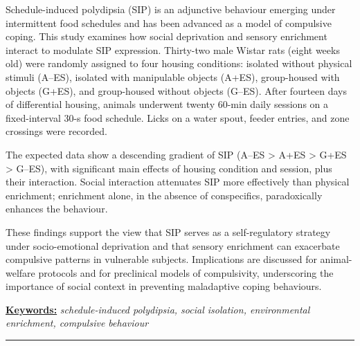 \documentclass[12pt,a4paper]{article}
\begin{document}
    \begin{center}
    \begin{minipage}{0.9\textwidth}
    \noindent
    Schedule-induced polydipsia (SIP) is an adjunctive behaviour emerging under intermittent food schedules and has been advanced as a model of compulsive coping. This study examines how social deprivation and sensory enrichment interact to modulate SIP expression. Thirty-two male Wistar rats (eight weeks old) were randomly assigned to four housing conditions: isolated without physical stimuli (A--ES), isolated with manipulable objects (A+ES), group-housed with objects (G+ES), and group-housed without objects (G--ES). After fourteen days of differential housing, animals underwent twenty 60-min daily sessions on a fixed-interval 30-s food schedule. Licks on a water spout, feeder entries, and zone crossings were recorded.
    
    The expected data show a descending gradient of SIP (A--ES > A+ES > G+ES > G--ES), with significant main effects of housing condition and session, plus their interaction. Social interaction attenuates SIP more effectively than physical enrichment; enrichment alone, in the absence of conspecifics, paradoxically enhances the behaviour.

    These findings support the view that SIP serves as a self-regulatory strategy under socio-emotional deprivation and that sensory enrichment can exacerbate compulsive patterns in vulnerable subjects. Implications are discussed for animal-welfare protocols and for preclinical models of compulsivity, underscoring the importance of social context in preventing maladaptive coping behaviours.
    
    \vspace{2mm}
    \noindent
    \underline{\textbf{Keywords:}} \textit{schedule-induced polydipsia, social isolation, environmental enrichment, compulsive behaviour}
    \end{minipage}
    \end{center}
    
    \vspace{3mm}
    
    \begin{center}
    \textcolor{azul}{\rule{150mm}{0.5mm}}
    \end{center}
       

\vspace{15mm}
\end{document}
